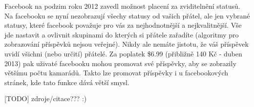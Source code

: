 \documentclass[thesis=M,czech]{FITthesis}[2013/05/10]
\begin{document}
Facebook na podzim roku 2012 zavedl možnost placení za zviditelnění statusů. Na facebooku se nyní nezobrazují všechy statusy od vašich přátel, ale jen vybrané statusy, které facebook považuje pro vás za nejhodnotnější a nejkvalitnější. Vše jde nastavit a ovlivnit skupinami do kterých si přátele zařadíte (algoritmy pro zobrazování příspěvků nejsou veřejné). Nikdy ale nemáte jistotu, že váš příspěvek uvidí všichni (nebo určití) přátelé. Za poplatek \$6.99 (přibližně 140 Kč - duben 2013) pak uživaté facebooku mohou promovat své příspěvky, aby se zobrazily většímu počtu kamarádů. Takto lze promovat příspěvky i u facebookových stránek, kde tato funkce dává větší smysl.


[TODO] zdroje/citace??? :)



\appendix
\end{document}
